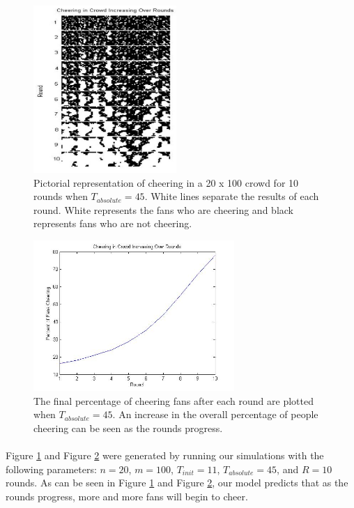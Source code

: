 \documentclass[oneside,12pt]{report}
\begin{document}
\begin{figure}[h]
    \begin{center}
        \includegraphics[height=2.5in]{sample_graph.jpg}
    \end{center}
    \caption[Pictorial representation of the progression of cheering over time with a lower absolute threshold.]{Pictorial representation of cheering in a 20 x 100 crowd for 10 rounds when $T_{absolute}=45$. White lines separate the results of each round. White represents the fans who are cheering and black represents fans who are not cheering.}
    \label{fig:graph1}
\end{figure}

\begin{figure}[h]
    \begin{center}
        \includegraphics[width=3in]{sample_graph2.jpg}
    \end{center}
    \caption[Plot of cheering levels over time in a simulated crowd with a lower absolute threshold.]{The final percentage of cheering fans after each round are plotted when $T_{absolute}=45$.  An increase in the overall percentage of people cheering can be seen as the rounds progress.}
    \label{fig:graph2}
\end{figure}

\paragraph{}
Figure \ref{fig:graph1} and Figure \ref{fig:graph2} were generated by running our simulations with the following parameters: $n=20$, $m=100$, $T_{init}=11$, $T_{absolute}=45$, and $R=10$ rounds. As can be seen in Figure \ref{fig:graph1} and Figure \ref{fig:graph2}, our model predicts that as the rounds progress, more and more fans will begin to cheer. 
\end{document}
